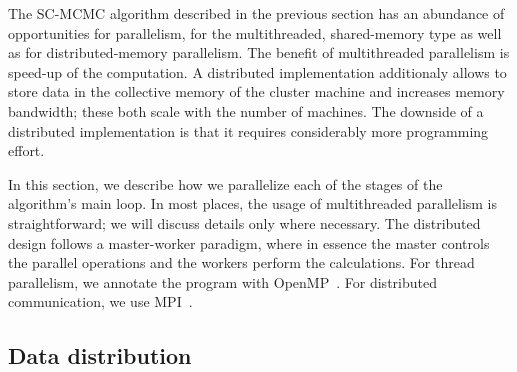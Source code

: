 \begin{comment}
- pi storage: DKV
   . pi/phi is read in 3), 4), 5a), 7)
   . pi is written in 4); read[i], then write[i], so no other data dependencies
   . so access is very synchronous: either read-only, or write without
     concurrent readers
   . DKV store properties:
      - single-sized keys
      - contiguous key space (integers 0..N-1)
      - update-only writes: no new KVs, no deletes
     so: no load imbalance, no hashing that is worth its name
      - no read/write or write/write concurrency
     so:
      - build RDMA store with remote reads and remote writes only, with exactly
        one RDMA transaction per read or write
\end{comment}



The SC-MCMC algorithm described in the previous section has an abundance of
opportunities for parallelism, for the multithreaded, shared-memory type as
well as for distributed-memory parallelism. The benefit of multithreaded
parallelism is speed-up of the computation. A distributed implementation
additionaly allows to store data in the collective memory of the cluster
machine and increases memory bandwidth; these both scale with the number of
machines. The downside of a distributed implementation is that it requires
considerably more programming effort.


In this section, we describe how we parallelize each of the stages of the
algorithm's main loop. In most places, the usage of multithreaded parallelism
is straightforward; we will discuss details only where necessary. The
distributed design follows a master-worker paradigm, where in essence
the master controls the parallel operations and the workers perform the
calculations. For thread parallelism, we annotate the program with
OpenMP~\cite{OpenMP}. For distributed communication, we use MPI~\cite{MPI}.


\subsection{Data distribution}

